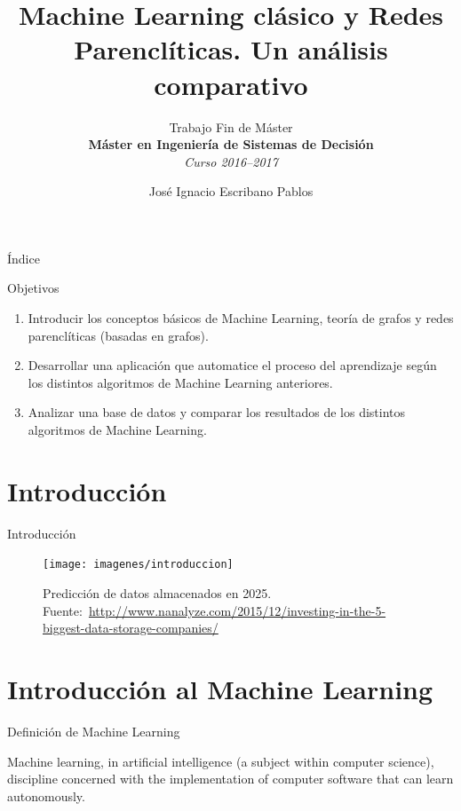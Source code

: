 \documentclass[hyperref={unicode}]{beamer}
\title{Machine Learning clásico y Redes Parenclíticas. Un análisis comparativo}
\subtitle{Trabajo Fin de Máster \\ \textbf{Máster en Ingeniería de Sistemas de Decisión} \\ \textit{Curso 2016--2017}}
\author{José Ignacio Escribano Pablos}
\institute{\begin{tabular}{c}
Ana Elizabeth García Sipols \\
Miguel Romance del Río     
\end{tabular}}
\begin{document}
\setcounter{showProgressBar}{0}
\setcounter{showSlideNumbers}{0}

\frame{\titlepage}

\begin{frame}{Índice}
	\tableofcontents
\end{frame}

\setcounter{framenumber}{0}
\setcounter{showProgressBar}{1}
\setcounter{showSlideNumbers}{1}

\begin{frame}{Objetivos}
	\begin{enumerate}
		\item Introducir los conceptos básicos de Machine Learning, teoría de grafos y redes parenclíticas (basadas en grafos).
		
		\item \pause Desarrollar una aplicación que automatice el proceso del aprendizaje según los distintos algoritmos de Machine Learning anteriores.
		
		\item \pause Analizar una base de datos y comparar los resultados de los distintos algoritmos de Machine Learning.
	\end{enumerate}
\end{frame}

\section{Introducción}
\begin{frame}{Introducción}
	\begin{figure}
			\begin{center}
			\texttt{[image: imagenes/introduccion]}
			\caption{Predicción de datos almacenados en 2025. Fuente:~\url{http://www.nanalyze.com/2015/12/investing-in-the-5-biggest-data-storage-companies/}}
			\end{center}
		\end{figure}
\end{frame}

\section{Introducción al Machine Learning}
\begin{frame}{Definición de Machine Learning}
	\begin{fancyquotes}
		Machine learning, in artificial intelligence (a subject within computer science), discipline concerned with the implementation of computer software that can learn autonomously.
	\end{fancyquotes}
\end{frame}
\end{document}
